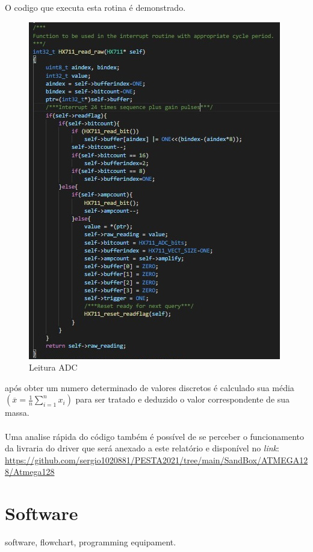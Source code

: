 \newpage
O codigo que executa esta rotina é demonstrado.
\begin{figure}[H]
	\centering
	\includegraphics[scale=0.8]{./image/PESTA/Code/read_raw.jpg}
	\caption{Leitura ADC}
	\label{read_raw}
\end{figure}
após obter um numero determinado de valores discretos é calculado sua média $\left( \overline{x}  =  \frac{1}{n}\sum_{i=1}^n x_i \right)$ para ser tratado e deduzido o valor correspondente de sua massa. \\
\\
Uma analise rápida do código também é possível de se perceber o funcionamento da livraria do driver que será anexado a este relatório e disponível no \textit{link}: \url{https://github.com/sergio1020881/PESTA2021/tree/main/SandBox/ATMEGA128/Atmega128}
\newpage
\section{Software}
software, flowchart, programming equipament.


\newpage

